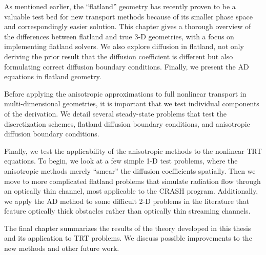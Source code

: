 As mentioned earlier, the ``flatland'' geometry has recently proven to be a
valuable test bed for new transport methods because of its smaller phase space
and correspondingly easier solution. This chapter gives a thorough overview of
the differences between flatland and true 3-D geometries, with a focus on
implementing flatland solvers. We also explore diffusion in flatland, not only
deriving the prior result that the diffusion coefficient is different but also
formulating correct diffusion boundary conditions. Finally, we present the AD
equations in flatland geometry.

Before applying the anisotropic approximations to full nonlinear transport in
multi-dimensional geometries, it is important that we test individual components
of the derivation. We detail several steady-state problems that test the
discretization schemes, flatland diffusion boundary conditions, and anisotropic
diffusion boundary conditions.

Finally, we test the applicability of the anisotropic methods to the nonlinear
TRT equations. To begin, we look at a few simple 1-D test problems, where the
anisotropic methods merely ``smear'' the diffusion coefficients spatially. Then
we move to more complicated flatland problems that simulate radiation flow
through an optically thin channel, most applicable to the CRASH program.
Additionally, we apply the AD method to some difficult 2-D problems in the
literature that feature optically thick obstacles rather than optically thin
streaming channels.

The final chapter summarizes the results of the theory developed in this thesis
and its application to TRT problems. We discuss possible improvements to the new
methods and other future work.

